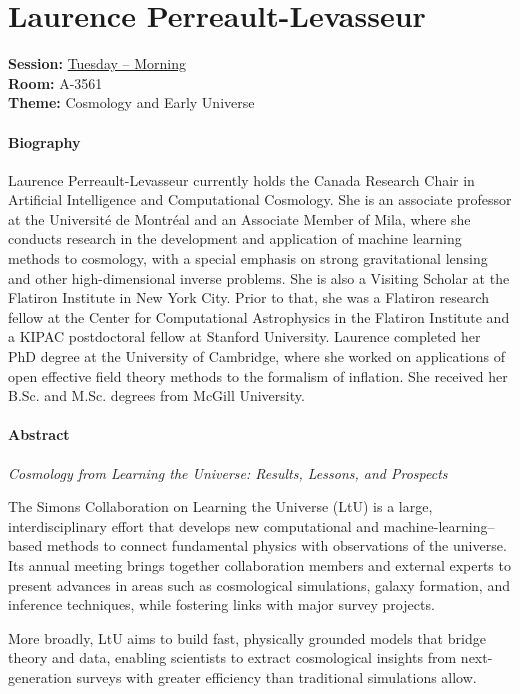 \hypertarget{invited-laurence-perreault-levasseur}{}
\label{invited-page-laurence-perreault-levasseur}
\section{Laurence Perreault-Levasseur}
\textbf{Session:} \hyperlink{schedule-tuesday-morning-a-3561}{Tuesday -- Morning}\\
\textbf{Room:} A-3561\\
\textbf{Theme:} Cosmology and Early Universe\\

\paragraph{Biography}
{\sffamily
Laurence Perreault-Levasseur currently holds the Canada Research Chair in Artificial Intelligence and Computational Cosmology. She is an associate professor at the Université de Montréal and an Associate Member of Mila, where she conducts research in the development and application of machine learning methods to cosmology, with a special emphasis on strong gravitational lensing and other high-dimensional inverse problems. She is also a Visiting Scholar at the Flatiron Institute in New York City. Prior to that, she was a Flatiron research fellow at the Center for Computational Astrophysics in the Flatiron Institute and a KIPAC postdoctoral fellow at Stanford University. Laurence completed her PhD degree at the University of Cambridge, where she worked on applications of open effective field theory methods to the formalism of inflation. She received her B.Sc. and M.Sc. degrees from McGill University.
}

\paragraph{Abstract}
{\itshape
Cosmology from Learning the Universe: Results, Lessons, and Prospects

The Simons Collaboration on Learning the Universe (LtU) is a large, interdisciplinary effort that develops new computational and machine-learning–based methods to connect fundamental physics with observations of the universe. Its annual meeting brings together collaboration members and external experts to present advances in areas such as cosmological simulations, galaxy formation, and inference techniques, while fostering links with major survey projects.

More broadly, LtU aims to build fast, physically grounded models that bridge theory and data, enabling scientists to extract cosmological insights from next-generation surveys with greater efficiency than traditional simulations allow.
}

